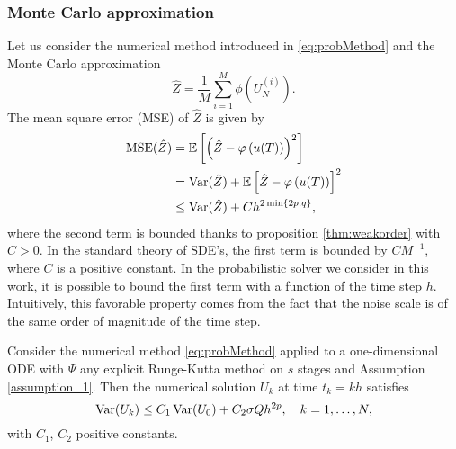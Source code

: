 \subsubsection{Monte Carlo approximation}

Let us consider the numerical method introduced in \eqref{eq:probMethod} and the Monte Carlo approximation 
\begin{equation}\label{eq:MCapproximation}
\hat Z = \frac{1}{M} \sum_{i = 1}^M \phi\left(U_N^{(i)}\right).
\end{equation}
The mean square error (MSE) of $\hat Z$ is given by
\begin{equation}\label{eq:MCMSE}
\begin{aligned}
	\operatorname{MSE}(\hat Z) &= \mathbb{E}\left[\left(\hat Z - \varphi\left(u(T)\right)\right)^2\right] \\
	&= \operatorname{Var}(\hat Z) + \mathbb{E}\left[\hat Z - \varphi\left(u(T)\right)\right]^2 \\
	&\leq \operatorname{Var}(\hat Z) + C h^{2\min\{2p, q\}},
\end{aligned}
\end{equation} 
where the second term is bounded thanks to proposition \ref{thm:weakorder} with $C > 0$. In the standard theory of SDE's, the first term is bounded by $CM^{-1}$, where $C$ is a positive constant. In the probabilistic solver we consider in this work, it is possible to bound the first term with a function of the time step $h$. Intuitively, this favorable property comes from the fact that the noise scale is of the same order of magnitude of the time step. 
\begin{lemma}\label{lem:varMC} Consider the numerical method \eqref{eq:probMethod} applied to a one-dimensional ODE with $\Psi$ any explicit Runge-Kutta method on $s$ stages and Assumption \ref{assumption_1}. Then the numerical solution $U_k$ at time $t_k = kh$ satisfies
\begin{equation}
	\operatorname{Var}(U_k) \leq C_1\operatorname{Var}(U_0) + C_2\sigma Q h^{2p}, \quad k = 1, \ldots, N,
\end{equation}
with $C_1$, $C_2$ positive constants.
\end{lemma}
